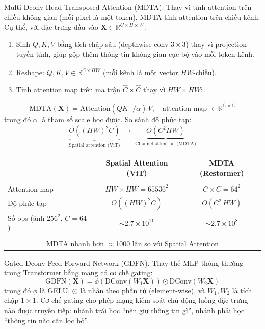 Multi-Dconv Head Transposed Attention (MDTA).
Thay vì tính attention trên chiều không gian (mỗi pixel là một token), MDTA tính attention trên chiều kênh. Cụ thể, với đặc trưng đầu vào $\mathbf{X} \in \mathbb{R}^{C \times H \times W}$:
\begin{enumerate}\itemsep1pt
    \item Sinh $Q, K, V$ bằng tích chập sâu (depthwise conv $3\!\times\!3$) thay vì projection tuyến tính, giúp gộp thêm thông tin không gian cục bộ vào mỗi token kênh.
    \item Reshape: $Q, K, V \in \mathbb{R}^{\hat{C} \times HW}$ (mỗi kênh là một vector $HW$-chiều).
    \item Tính attention map trên ma trận $\hat{C} \times \hat{C}$ thay vì $HW \times HW$:
\end{enumerate}
\begin{equation}
\mathrm{MDTA}(\mathbf{X}) = \mathrm{Attention}(Q K^\top / \alpha)\, V, \quad
\text{attention map } \in \mathbb{R}^{\hat{C} \times \hat{C}}
\label{eq:mdta}
\end{equation}
trong đó $\alpha$ là tham số scale học được. So sánh độ phức tạp:
\[
\underbrace{O\!\left((HW)^2 C\right)}_{\text{Spatial attention (ViT)}}
\;\longrightarrow\;
\underbrace{O\!\left(C^2 HW\right)}_{\text{Channel attention (MDTA)}}
\]
\begin{tcolorbox}[
    enhanced, arc=5pt, boxrule=1.2pt,
    colback=blue!4!white, colframe=blue!35!black,
    left=10pt, right=10pt, top=6pt, bottom=6pt
]
\centering
\small
\begin{tabular}{lcc}
    & \textbf{Spatial Attention (ViT)} & \textbf{MDTA (Restormer)} \\[3pt]
    \hline\\[-6pt]
    Attention map & $HW \times HW = 65536^2$ & $C \times C = 64^2$ \\[2pt]
    Độ phức tạp   & $O\!\left((HW)^2 C\right)$ & $O\!\left(C^2\, HW\right)$ \\[2pt]
    Số ops (ảnh $256^2$, $C\!=\!64$) & $\sim 2.7\times10^{11}$ & $\sim 2.7\times10^{8}$ \\[4pt]
    \hline\\[-6pt]
    \multicolumn{3}{c}{\normalsize MDTA nhanh hơn $\approx$1000 lần so với Spatial Attention}
\end{tabular}
\end{tcolorbox}

Gated-Dconv Feed-Forward Network (GDFN).
Thay thế MLP thông thường trong Transformer bằng mạng có cơ chế gating:
\begin{equation}
\mathrm{GDFN}(\mathbf{X}) = \phi\!\left(\mathrm{DConv}(W_1 \mathbf{X})\right) \odot \mathrm{DConv}(W_2 \mathbf{X})
\label{eq:gdfn}
\end{equation}
trong đó $\phi$ là GELU, $\odot$ là nhân theo phần tử (element-wise), và $W_1, W_2$ là tích chập $1\!\times\!1$. Cơ chế gating cho phép mạng kiểm soát chủ động luồng đặc trưng nào được truyền tiếp: nhánh trái học ``nên giữ thông tin gì'', nhánh phải học ``thông tin nào cần lọc bỏ''.

